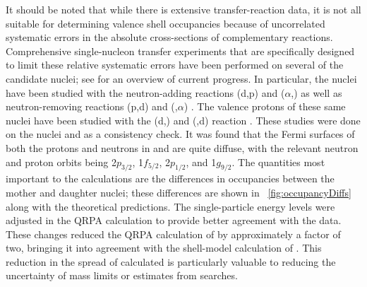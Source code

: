 It should be noted that while there is extensive transfer-reaction data, it is not all suitable for determining valence shell occupancies because of uncorrelated systematic errors in the absolute cross-sections of complementary reactions.  Comprehensive single-nucleon transfer experiments that are specifically designed to limit these relative systematic errors have been performed on several of the candidate nuclei; see \citep{schiffer_review} for an overview of current progress.  In particular, the nuclei \GeTargets have been studied with the neutron-adding reactions (d,p) and ($\alpha$,) as well as neutron-removing reactions (p,d) and (,$\alpha$) \citep{valenceNeutrons}.  The valence protons of these same nuclei have been studied with the (d,) and (,d) reaction \citep{valenceProtons}.  These studies were done on the nuclei  and  as a consistency check.  It was found that the Fermi surfaces of both the protons and neutrons in \GeTargets and \SeProducts are quite diffuse, with the relevant neutron and proton orbits being 2$p_{3/2}$, 1$f_{5/2}$, 2$p_{1/2}$, and 1$g_{9/2}$.  The quantities most important to the \NME calculations are the differences in occupancies between the mother and daughter nuclei; these differences are shown in {\fig}~\ref{fig:occupancyDiffs} along with the theoretical predictions.  The single-particle energy levels were adjusted in the QRPA calculation \citep{SuhonenEnergyAdjust} to provide better agreement with the data.  These changes reduced the QRPA calculation of \NME by approximately a factor of two, bringing it into agreement with the shell-model calculation of \NME.  This reduction in the spread of calculated \NME is particularly valuable to reducing the uncertainty of mass limits or estimates from \zvbb searches. 
